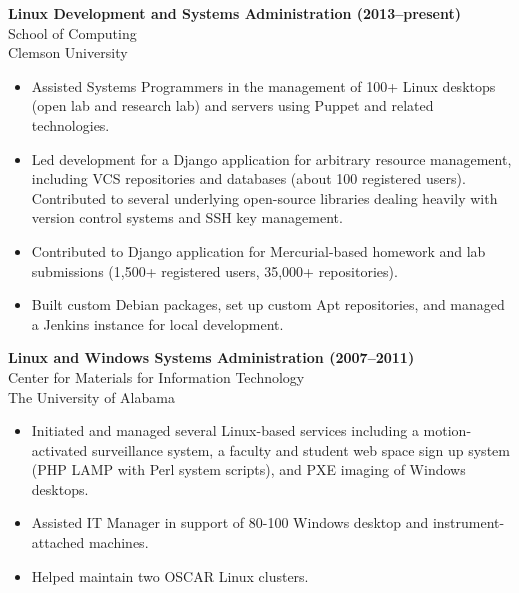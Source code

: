 \textbf{Linux Development and Systems Administration (2013--present)} \\
School of Computing \\
Clemson University

\begin{itemize}
  \item Assisted Systems Programmers in the management of 100+ Linux desktops
        (open lab and research lab) and servers using Puppet and related
        technologies.
  \item Led development for a Django application for arbitrary resource
        management, including VCS repositories and databases (about 100
        registered users). Contributed to several underlying open-source
        libraries dealing heavily with version control systems and SSH key
        management.
  \item Contributed to Django application for Mercurial-based homework and lab
        submissions (1,500+ registered users, 35,000+ repositories).
  \item Built custom Debian packages, set up custom Apt repositories, and
        managed a Jenkins instance for local development.
\end{itemize}

\textbf{Linux and Windows Systems Administration (2007--2011)} \\
Center for Materials for Information Technology \\
The University of Alabama

\begin{itemize}
  \item Initiated and managed several Linux-based services including a
        motion-activated surveillance system, a faculty and student web space
        sign up system (PHP LAMP with Perl system scripts), and PXE imaging of
        Windows desktops.
  \item Assisted IT Manager in support of 80-100 Windows desktop and
        instrument-attached machines.
  \item Helped maintain two OSCAR Linux clusters.
\end{itemize}
